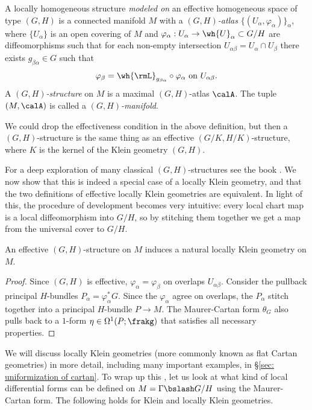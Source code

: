 \begin{defn}\label{def GH-structure}
    A locally homogeneous structure \emph{modeled on} an effective homogeneous space of type $(G,H)$ is a connected manifold $M$ with a \emph{$(G,H)$-atlas} $\{(U_\alpha,\varphi_\alpha)\}_\alpha$, where $\{U_\alpha\}$ is an open covering of $M$ and $\varphi_\alpha:U_\alpha\to \wh{U}_{\alpha}\subset G\slash H$ are diffeomorphisms such that for each non-empty intersection $U_{\alpha\beta}=U_\alpha\cap U_\beta$ there exists $g_{\beta\alpha}\in G$ such that 
    \[\varphi_{\beta}=\wh{\rmL}_{g_{\beta\alpha}}\circ \varphi_\alpha\text{ on }U_{\alpha\beta}.\]
    A \emph{$(G,H)$-structure} on $M$ is a maximal $(G,H)$-atlas $\calA$. The tuple $(M,\calA)$ is called a \emph{$(G,H)$-manifold}.
\end{defn}

\begin{rem}
    We could drop the effectiveness condition in the above definition, but then a $(G,H)$-structure is the same thing as an effective $(G/K,H/K)$-structure, where $K$ is the kernel of the Klein geometry $(G,H)$.
\end{rem}

For a deep exploration of many classical $(G,H)$-structures see the book \cite{Goldman}. We now show that this is indeed a special case of a locally Klein geometry, and that the two definitions of effective locally Klein geometries are equivalent. In light of this, the procedure of development becomes very intuitive: every local chart map is a local diffeomorphism into $G\slash H$, so by stitching them together we get a map from the universal cover to $G\slash H$.

\begin{prop}
    An effective $(G,H)$-structure on $M$ induces a natural locally Klein geometry on $M$.
\end{prop}
\begin{proof}
    Since $(G,H)$ is effective, $\varphi_\alpha=\varphi_\beta$ on overlaps $U_{\alpha\beta}$. Consider the pullback principal $H$-bundles $P_\alpha=\varphi_\alpha^\ast G$. Since the $\varphi_\alpha$ agree on overlaps, the $P_\alpha$ stitch together into a principal $H$-bundle $P\to M$. The Maurer-Cartan form $\theta_G$ also pulls back to a $1$-form $\eta\in\Omega^1(P;\frakg)$ that satisfies all necessary properties.
\end{proof}


We will discuss locally Klein geometries (more commonly known as flat Cartan geometries) in more detail, including many important examples, in \S\ref{sec: uniformization of cartan}. To wrap up this \sect, let us look at what kind of local differential forms can be defined on $M=\Gamma\bslash G\slash H$ using the Maurer-Cartan form. The following holds for Klein and locally Klein geometries.

